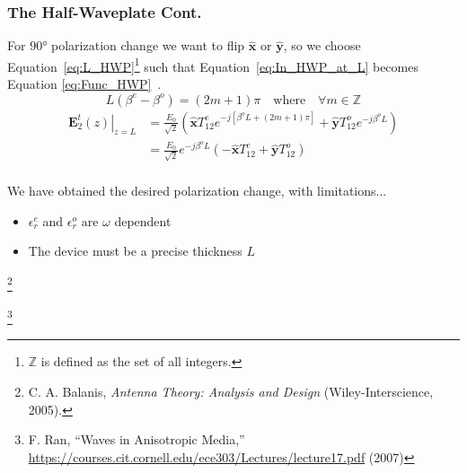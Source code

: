 \documentclass[aspectratio=169,t,xcolor=table]{beamer}
\newcommand{\bv}[1]{\mathbf{#1}}
\newcommand{\vecc}[1]{\mathbf{#1}}
\newcommand\blfootnote[1]{%
  \begingroup
  \renewcommand\thefootnote{}\footnote[frame]{\tiny #1}%
  \addtocounter{footnote}{-1}%
  \endgroup
}
\begin{document}
\begin{frame}
    \frametitle{The Half-Waveplate Cont.} \vspace{-1.2em}
    For $\ang{90}$ polarization change we want to flip $\bv{\hat{x}}$ or 
    $\bv{\hat{y}}$, so we choose Equation~\eqref{eq:L_HWP}\footnote[frame]{\tiny
    $\mathbb{Z}$ is defined as the set of all integers.}    
    such that Equation~\eqref{eq:In_HWP_at_L}
    becomes Equation \eqref{eq:Func_HWP}~\cite{Balanis-2012,Wav_anis}.
    \begin{equation}\label{eq:L_HWP}
        L(\beta^e-\beta^o) = (2m+1)\pi
        \quad\text{where}\quad
        \forall m \in \mathbb{Z}
    \end{equation}\vspace{-0.7em}   \pause
    \begin{equation}\label{eq:Func_HWP}
        \begin{aligned}
        \left.\vecc{E}^t_2(z) \right|_{z = L} &
        = \frac{E_0}{\sqrt{2}}\left(
            \bv{\hat{x}}T_{12}^{e} e^{-j\left[\beta^oL + (2m+1)\pi\right]} +
            \bv{\hat{y}}T_{12}^{o} e^{-j\beta^o L}
        \right)\\
        & = \frac{E_0}{\sqrt{2}}e^{-j\beta^o L}\left(
            -\bv{\hat{x}}T_{12}^{e} + \bv{\hat{y}}T_{12}^{o} 
        \right)\\
        \end{aligned}
    \end{equation} \vspace{-1em}\pause
    \begin{block}{We have obtained the desired polarization change, with 
        limitations...}
        \begin{itemize}
            \item $\epsilon_r^e$ and $\epsilon_r^o$ are $\omega$ dependent
            \item The device must be a precise thickness $L$
        \end{itemize}
    \end{block}
    \blfootnote{
        \cite{Balanis-2012} C. A. Balanis, \textit{Antenna Theory: 
        Analysis and Design}
        (Wiley-Interscience, 2005).
    }
    \blfootnote{
        \cite{Wav_anis} F. Ran, ``Waves in Anisotropic Media,''
        \url{https://courses.cit.cornell.edu/ece303/Lectures/lecture17.pdf} (2007)
    }
    \end{frame}
\end{document}
